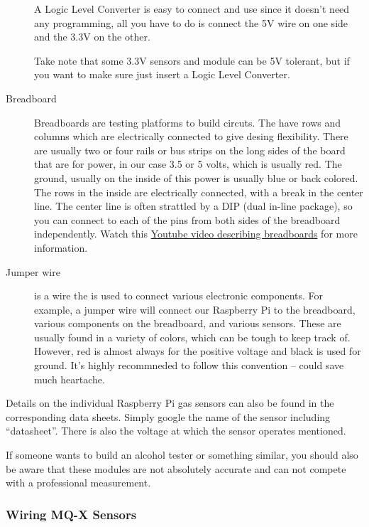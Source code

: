 \documentclass{article}\usepackage[]{graphicx}\usepackage[]{color}
\begin{document}
\begin{description}
A Logic Level Converter is easy to connect and use since it doesn’t need any programming, all you have to do is connect the 5V wire on one side and the 3.3V on the other.

Take note that some 3.3V sensors and module can be 5V tolerant, but if you want to make sure just insert a Logic Level Converter.

\item[Breadboard] Breadboards are testing platforms to build circuts. The have rows and columns which are electrically connected to give desing flexibility. There are usually two or four rails or bus strips on the long sides of the board that are for power, in our case 3.5 or 5 volts, which is usually red. The ground, usually on the inside of this power is usually blue or back colored. The rows in the inside are electrically connected, with a break in the center line. The center line is often strattled by a DIP (dual in-line package), so you can connect to each of the pins from both sides of the breadboard independently. Watch this \href{https://www.google.com/search?q=how+to+breadboards+work&rlz=1C1CHBD_enUS834US834&oq=how+to+breadboards+work&aqs=chrome..69i57j0l3.5628j1j7&sourceid=chrome&ie=UTF-8#kpvalbx=_Gz39Xq2-CuTi9APB3JGYCQ52}{Youtube video describing breadboards} for more information. 
\item[Jumper wire] is a wire the is used to connect various electronic components. For example, a jumper wire will connect our Raspberry Pi to the breadboard, various components on the breadboard, and various sensors. These are usually found in a variety of colors, which can be tough to keep track of. However, red is almost always for the positive voltage and black is used for ground. It's highly recommneded to follow this convention -- could save much heartache.

\end{description}

Details on the individual Raspberry Pi gas sensors can also be found in the corresponding data sheets. Simply google the name of the sensor including ``datasheet''. There is also the voltage at which the sensor operates mentioned.

If someone wants to build an alcohol tester or something similar, you should also be aware that these modules are not absolutely accurate and can not compete with a professional measurement.

\subsubsection{Wiring MQ-X Sensors}
\end{document}
